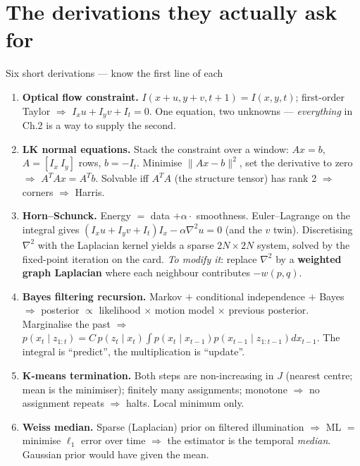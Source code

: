 \documentclass[9pt,a4paper]{extarticle}
\newcommand{\Ix}{I_x}\newcommand{\Iy}{I_y}\newcommand{\It}{I_t}
\begin{document}
\section{The derivations they actually ask for}

\begin{keybox}{Six short derivations --- know the first line of each}
\begin{enumerate}
  \item \textbf{Optical flow constraint.} $I(x{+}u,y{+}v,t{+}1)=I(x,y,t)$; first-order Taylor $\Rightarrow$ $\Ix u+\Iy v+\It=0$. One equation, two unknowns --- \emph{everything} in Ch.2 is a way to supply the second.
  \item \textbf{LK normal equations.} Stack the constraint over a window: $Ax=b$, $A=[\Ix\ \Iy]$ rows, $b=-\It$. Minimise $\|Ax-b\|^2$, set the derivative to zero $\Rightarrow$ $A^TAx=A^Tb$. Solvable iff $A^TA$ (the structure tensor) has rank 2 $\Rightarrow$ corners $\Rightarrow$ Harris.
  \item \textbf{Horn--Schunck.} Energy $=$ data $+\alpha\cdot$ smoothness. Euler--Lagrange on the integral gives $(\Ix u+\Iy v+\It)\Ix-\alpha\nabla^2u=0$ (and the $v$ twin). Discretising $\nabla^2$ with the Laplacian kernel yields a sparse $2N\times2N$ system, solved by the fixed-point iteration on the card. \emph{To modify it}: replace $\nabla^2$ by a \textbf{weighted graph Laplacian} where each neighbour contributes $-w(p,q)$.
  \item \textbf{Bayes filtering recursion.} Markov $+$ conditional independence $+$ Bayes $\Rightarrow$ posterior $\propto$ likelihood $\times$ motion model $\times$ previous posterior. Marginalise the past $\Rightarrow$ $p(x_t\mid z_{1:t})=C\,p(z_t\mid x_t)\int p(x_t\mid x_{t-1})p(x_{t-1}\mid z_{1:t-1})dx_{t-1}$. The integral is ``predict'', the multiplication is ``update''.
  \item \textbf{K-means termination.} Both steps are non-increasing in $J$ (nearest centre; mean is the minimiser); finitely many assignments; monotone $\Rightarrow$ no assignment repeats $\Rightarrow$ halts. Local minimum only.
  \item \textbf{Weiss median.} Sparse (Laplacian) prior on filtered illumination $\Rightarrow$ ML $=$ minimise $\ell_1$ error over time $\Rightarrow$ the estimator is the temporal \emph{median}. Gaussian prior would have given the mean.
\end{enumerate}
\end{keybox}

\end{document}
